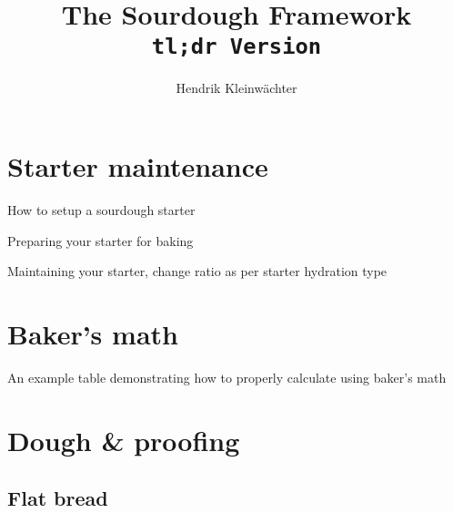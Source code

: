\documentclass[paper=a4, twoside=false, fontsize=12pt]{scrbook}
\author{Hendrik Kleinwächter}
\title{The Sourdough Framework\\\texttt{tl;dr Version}}
\begin{document}
\maketitle

\section*{Starter maintenance}
\begin{flowchart}[!htb]
    \centering
    
    \caption*{How to setup a sourdough starter}
\end{flowchart}

\begin{flowchart}[!htb]
    \centering
    
    \caption*{Preparing your starter for baking}
\end{flowchart}

\begin{flowchart}[!htb]
    \centering
    
    \caption*{Maintaining your starter, change ratio as per starter hydration
    type}
\end{flowchart}

\clearpage{}
\section*{Baker's math}
\begin{table}[!htb]
  \centering
  
  \caption*{An example table demonstrating how to properly calculate using
  baker's math}
\end{table}

\section*{Dough \& proofing}
\subsection*{Flat bread}

\clearpage{}
\end{document}
